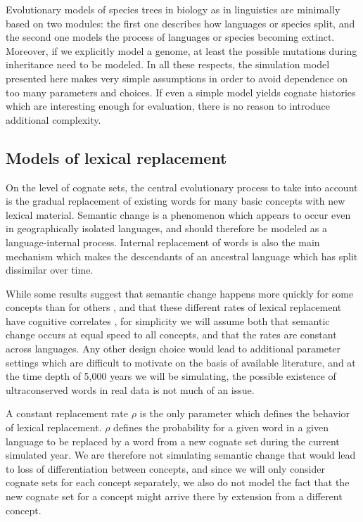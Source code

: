 Evolutionary models of species trees in biology as in linguistics are minimally based on two modules: the first one describes how languages or species split, and the second one models the process of languages or species becoming extinct. Moreover, if we explicitly model a genome, at least the possible mutations during inheritance need to be modeled. In all these respects, the simulation model presented here makes very simple assumptions in order to avoid dependence on too many parameters and choices. If even a simple model yields cognate histories which are interesting enough for evaluation, there is no reason to introduce additional complexity.

\subsection{Models of lexical replacement}
On the level of cognate sets, the central evolutionary process to take into account is the gradual replacement of existing words for many basic concepts with new lexical material. Semantic change is a phenomenon which appears to occur even in geographically isolated languages, and should therefore be modeled as a language-internal process. Internal replacement of words is also the main mechanism which makes the descendants of an ancestral language which has split dissimilar over time.

While some results suggest that semantic change happens more quickly for some concepts than for others \citep{pagel_ea_2007}, and that these different rates of lexical replacement have cognitive correlates \citep{vejdemo_hoerberg_2016}, for simplicity we will assume both that semantic change occurs at equal speed to all concepts, and that the rates are constant across languages. Any other design choice would lead to additional parameter settings which are difficult to motivate on the basis of available literature, and at the time depth of 5,000 years we will be simulating, the possible existence of ultraconserved words in real data is not much of an issue.

A constant replacement rate $\rho$ is the only parameter which defines the behavior of lexical replacement. $\rho$ defines the probability for a given word in a given language to be replaced by a word from a new cognate set during the current simulated year. We are therefore not simulating semantic change that would lead to loss of differentiation between concepts, and since we will only consider cognate sets for each concept separately, we also do not model the fact that the new cognate set for a concept might arrive there by extension from a different concept.

